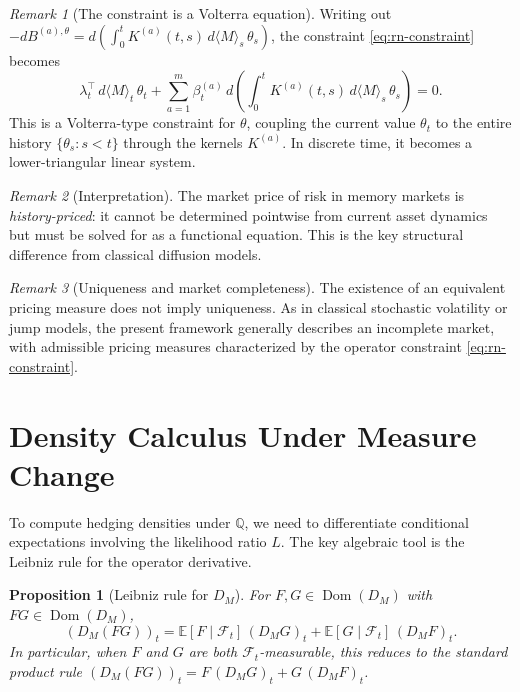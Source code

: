 \documentclass[11pt]{article}
\theoremstyle{plain}
\newtheorem{proposition}{Proposition}[section]
\theoremstyle{definition}
\theoremstyle{remark}
\newtheorem{remark}{Remark}[section]
\newcommand{\E}{\mathbb{E}}
\newcommand{\F}{\mathcal{F}}
\newcommand{\QQ}{\mathbb{Q}}
\newcommand{\bracket}[1]{\langle #1 \rangle}
\DeclareMathOperator{\Dom}{Dom}
\begin{document}
\begin{remark}[The constraint is a Volterra equation]
Writing out $-dB^{(a),\theta} = d(\int_0^t K^{(a)}(t,s)\,d\bracket{M}_s\,\theta_s)$,
the constraint \eqref{eq:rn-constraint} becomes
\[
\lambda_t^\top\,d\bracket{M}_t\,\theta_t + \sum_{a=1}^m \beta_t^{(a)}\,d\left(\int_0^t K^{(a)}(t,s)\,d\bracket{M}_s\,\theta_s\right) = 0.
\]
This is a Volterra-type constraint for $\theta$, coupling the current value
$\theta_t$ to the entire history $\{\theta_s : s < t\}$ through the kernels
$K^{(a)}$. In discrete time, it becomes a lower-triangular linear system.
\end{remark}

\begin{remark}[Interpretation]
The market price of risk in memory markets is \emph{history-priced}: it
cannot be determined pointwise from current asset dynamics but must be
solved for as a functional equation. This is the key structural difference
from classical diffusion models.
\end{remark}

\begin{remark}[Uniqueness and market completeness]
The existence of an equivalent pricing measure does not imply uniqueness.
As in classical stochastic volatility or jump models, the present framework
generally describes an incomplete market, with admissible pricing measures
characterized by the operator constraint \eqref{eq:rn-constraint}.
\end{remark}

\section{Density Calculus Under Measure Change}\label{sec:density}

To compute hedging densities under $\QQ$, we need to differentiate conditional
expectations involving the likelihood ratio $L$. The key algebraic tool is
the Leibniz rule for the operator derivative.

\begin{proposition}[Leibniz rule for $D_M$]\label{prop:leibniz}
For $F, G \in \Dom(D_M)$ with $FG \in \Dom(D_M)$,
\begin{equation}\label{eq:leibniz}
(D_M(FG))_t = \E[F \mid \F_t]\,(D_M G)_t + \E[G \mid \F_t]\,(D_M F)_t.
\end{equation}
In particular, when $F$ and $G$ are both $\F_t$-measurable, this reduces to the
standard product rule $(D_M(FG))_t = F\,(D_M G)_t + G\,(D_M F)_t$.
\end{proposition}
\end{document}
